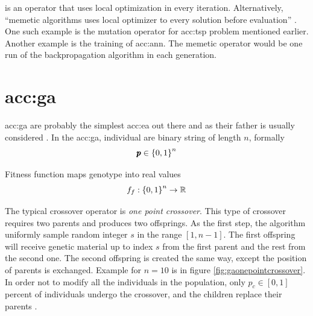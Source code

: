  is an operator that uses local optimization in every iteration. Alternatively, \enquote{memetic algorithms uses local optimizer to every solution before evaluation} \citep{HowToSolveItModernHeuristics}. One such example is the mutation operator for \acrlong{acc:tsp} problem mentioned earlier. Another example is the training of \acrshort{acc:ann}. The memetic operator would be one run of the backpropagation algorithm in each generation.




\section{\texorpdfstring{\acrlong*{acc:ga}}{Genetic algorithms}}

\acrfull{acc:ga} are probably the simplest \acrfull{acc:ea} out there and as their father is usually considered . In the \acrshort{acc:ga}, individual are binary string of length $n$, formally
$$ \pmb{p} \in \left\{0,1\right\}^{n} $$

Fitness function maps genotype into real values
$$ f_f:\left\{0,1\right\}^{n}\rightarrow\mathbb{R} $$

The typical crossover operator is \emph{one point crossover}. This type of crossover requires two parents and produces two offsprings. As the first step, the algorithm uniformly sample random integer $s$ in the range $\left[ 1, n-1 \right]$. The first offspring will receive genetic material up to index $s$ from the first parent and the rest from the second one. The second offspring is created the same way, except the position of parents is exchanged. Example for $n=10$ is in figure \ref{fig:gaonepointcrossover}. In order not to modify all the individuals in the population, only $p_c\in\left[0,1\right]$ percent of individuals undergo the crossover, and the children replace their parents \citep{IntroductionToEA}.

